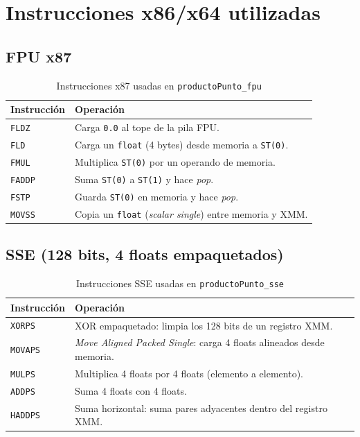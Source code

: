 \documentclass[12pt, letterpaper]{article}
\begin{document}
\section{Instrucciones x86/x64 utilizadas}

\subsection{FPU x87}

\begin{table}[H]
    \centering
    \begin{tabular}{@{}lp{10cm}@{}}
        \toprule
        \textbf{Instrucción} & \textbf{Operación} \\
        \midrule
        \texttt{FLDZ}  & Carga \texttt{0.0} al tope de la pila FPU. \\
        \texttt{FLD}   & Carga un \texttt{float} (4 bytes) desde memoria a \texttt{ST(0)}. \\
        \texttt{FMUL}  & Multiplica \texttt{ST(0)} por un operando de memoria. \\
        \texttt{FADDP} & Suma \texttt{ST(0)} a \texttt{ST(1)} y hace \textit{pop}. \\
        \texttt{FSTP}  & Guarda \texttt{ST(0)} en memoria y hace \textit{pop}. \\
        \texttt{MOVSS} & Copia un \texttt{float} (\textit{scalar single}) entre memoria y XMM. \\
        \bottomrule
    \end{tabular}
    \caption{Instrucciones x87 usadas en \texttt{productoPunto\_fpu}}
\end{table}

\subsection{SSE (128 bits, 4 floats empaquetados)}

\begin{table}[H]
    \centering
    \begin{tabular}{@{}lp{10cm}@{}}
        \toprule
        \textbf{Instrucción} & \textbf{Operación} \\
        \midrule
        \texttt{XORPS}  & XOR empaquetado: limpia los 128 bits de un registro XMM. \\
        \texttt{MOVAPS} & \textit{Move Aligned Packed Single}: carga 4 floats alineados desde memoria. \\
        \texttt{MULPS}  & Multiplica 4 floats por 4 floats (elemento a elemento). \\
        \texttt{ADDPS}  & Suma 4 floats con 4 floats. \\
        \texttt{HADDPS} & Suma horizontal: suma pares adyacentes dentro del registro XMM. \\
        \bottomrule
    \end{tabular}
    \caption{Instrucciones SSE usadas en \texttt{productoPunto\_sse}}
\end{table}
\end{document}
